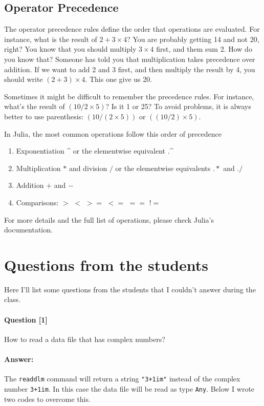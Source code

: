 \subsection{Operator Precedence}

The operator precedence rules define the order that operations are evaluated. For instance, what is the result of $2+3\times 4$? You are probably getting 14 and not 20, right? You know that you should multiply $3\times 4$ first, and them sum 2. How do you know that? Someone has told you that multiplication takes precedence over addition. If we want to add 2 and 3 first, and then multiply the result by 4, you should write $(2+3)\times 4$. This one give us 20.

Sometimes it might be difficult to remember the precedence rules. For instance, what's the result of $(10/2\times 5)$? Is it 1 or 25? To avoid problems, it is always better to use parenthesis: $(10/(2\times 5))$ or $((10/2)\times 5)$.

In Julia, the most common operations follow this order of precedence

\begin{enumerate}
 \item Exponentiation \textasciicircum{} or the elementwise equivalent .\textasciicircum{}
 \item Multiplication $*$ and division $/$ or the elementwise equivalents $.*$ and $./$
 \item Addition $+$ and $-$
 \item Comparisons: $>$ \; $<$ \; $>=$ \; $<=$ \; $==$ \; $!=$ 
\end{enumerate}

For more details and the full list of operations, please check Julia's documentation.


\section{Questions from the students}

Here I'll list some questions from the students that I couldn't answer during the class.

\paragraph*{Question [1]} How to read a data file that has complex numbers?

\paragraph*{Answer:} The \texttt{readdlm} command will return a string \texttt{"3+1im"} instead of the complex number \texttt{3+1im}. In this case the data file will be read as type \texttt{Any}. Below I wrote two codes to overcome this.

